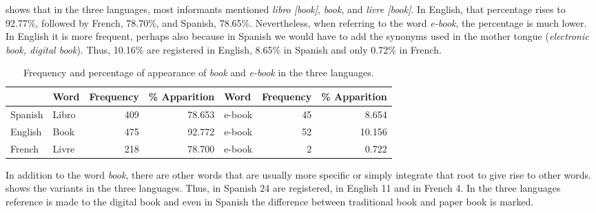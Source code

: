 \documentclass[english]{textolivre}
\begin{document}
 shows that in the three languages, most informants mentioned \textit{libro [book]}, \textit{book}, and \textit{livre [book]}. In English, that percentage rises to 92.77\%, followed by French, 78.70\%, and Spanish, 78.65\%. Nevertheless, when referring to the word \textit{e-book}, the percentage is much lower. In English it is more frequent, perhaps also because in Spanish we would have to add the synonyms used in the mother tongue (\textit{electronic book, digital book}). Thus, 10.16\% are registered in English, 8.65\% in Spanish and only 0.72\% in French.

\begin{table}[h!]
\centering
\begin{threeparttable}
\caption{Frequency and percentage of appearance of \textit{book} and \textit{e-book} in the three languages.}
\label{tab03}
\begin{tabular}{l l r r l r r}
\toprule
 & {Word} & {Frequency} & {\% Apparition} & {Word} & {Frequency} & {\% Apparition}   \\
 \midrule
Spanish & Libro & 409 & 78.653 & e-book & 45 & 8.654 \\
English & Book & 475 & 92.772 & e-book & 52 & 10.156 \\
French & Livre & 218 & 78.700 & e-book & 2 & 0.722 \\
\bottomrule
\end{tabular}
\end{threeparttable}
\end{table}

In addition to the word \textit{book}, there are other words that are usually more specific or simply integrate that root to give rise to other words.  shows the variants in the three languages. Thus, in Spanish 24 are registered, in English 11 and in French 4. In the three languages reference is made to the digital book and even in Spanish the difference between traditional book and paper book is marked.
\end{document}

